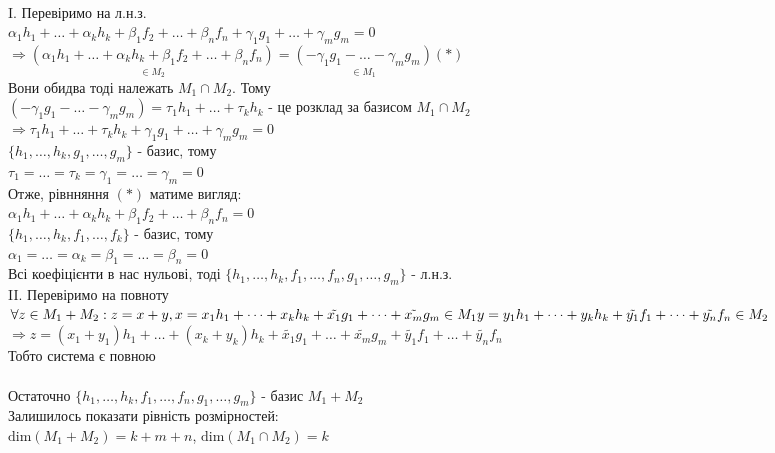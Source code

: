 \documentclass[a4paper, 14pt]{extarticle}
\def\bigline{\vspace{5mm}\\}
\def\dim#1{\textrm{dim} {#1}}
\begin{document}
	\\
	I. Перевіримо на л.н.з.\\
	$\alpha_1 h_1 + \dots + \alpha_k h_k + \beta_1 f_2 + \dots + \beta_n f_n + \gamma_1 g_1 + \dots + \gamma_m g_m = 0$\\
	$\Rightarrow \underset{\in M_2}{(\alpha_1 h_1 + \dots + \alpha_k h_k + \beta_1 f_2 + \dots + \beta_n f_n)} = \underset{\in M_1}{(-\gamma_1 g_1 - \dots - \gamma_m g_m)} (*)$\\
	Вони обидва тоді належать $M_1 \cap M_2$. Тому\\
	$(-\gamma_1 g_1 - \dots - \gamma_m g_m) = \tau_1 h_1 + \dots + \tau_k h_k$ - це розклад за базисом $M_1 \cap M_2$\\
	$\Rightarrow \tau_1 h_1 + \dots + \tau_k h_k +\gamma_1 g_1 + \dots + \gamma_m g_m = 0$\\
	$\{h_1, \dots, h_k, g_1, \dots, g_m\}$ - базис, тому\\
	$\tau_1 = \dots = \tau_k = \gamma_1 = \dots = \gamma_m = 0$\\
	Отже, рівнняння $(*)$ матиме вигляд:\\
	$\alpha_1 h_1 + \dots + \alpha_k h_k + \beta_1 f_2 + \dots + \beta_n f_n = 0$\\
	$\{h_1, \dots, h_k, f_1, \dots, f_k\}$ - базис, тому\\
	$\alpha_1 = \dots = \alpha_k = \beta_1 = \dots = \beta_n = 0$\\
	Всі коефіцієнти в нас нульові, тоді $\{h_1, \dots, h_k, f_1, \dots, f_n, g_1, \dots, g_m\}$ - л.н.з.
	\bigline
	II. Перевіримо на повноту\\
	$\forall z \in M_1 + M_2: z = x + y, \\x = x_1 h_1 + \dots + x_k h_k + \tilde{x_1}g_1 + \dots + \tilde{x_m}g_m \in M_1 \\ y = y_1 h_1 + \dots + y_k h_k + \tilde{y_1}f_1 + \dots + \tilde{y_n}f_n \in M_2$\\
	$\Rightarrow z = (x_1 + y_1)h_1 + \dots + (x_k + y_k)h_k + \tilde{x_1}g_1 + \dots + \tilde{x_m}g_m + \tilde{y_1}f_1 + \dots + \tilde{y_n}f_n$\\
	Тобто система є повною\\
	\\
	Остаточно $\{h_1, \dots, h_k, f_1, \dots, f_n, g_1, \dots, g_m\}$ - базис $M_1 + M_2$\\
	Залишилось показати рівність розмірностей:\\
	$\dim{(M_1+M_2)} = k + m + n$, \hspace{1cm} $\dim{(M_1 \cap M_2)} = k$\\
\end{document}
